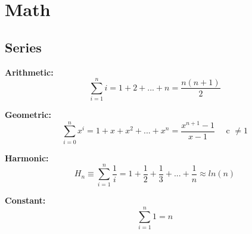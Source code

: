 \chapter{Math}

\section{Series}

\newenvironment{secDiv}[1]{\textbf{#1:}}{\newline\hspace{11pt}}

\begin{secDiv}{Arithmetic}
\begin{equation}
	\sum_{i=1}^{n}i = 1+2+...+n = \frac{n(n+1)}{2}
\end{equation}
\end{secDiv}

\begin{secDiv}{Geometric}
\begin{equation}
	\sum_{i=0}^{n}x^i = 1+x+x^2+...+x^n = \frac{x^{n+1}-1}{x-1}\textrm{~~~~c }\neq 1
\end{equation}
\end{secDiv}

\begin{secDiv}{Harmonic}
\begin{equation}
	H_n \equiv \sum_{i=1}^{n}\frac{1}{i} = 1+\frac{1}{2}+\frac{1}{3}+...+\frac{1}{n} \approx ln(n)
\end{equation}
\end{secDiv}

\begin{secDiv}{Constant}
	\begin{equation}
		\sum_{i=1}^{n}1 = n
	\end{equation}
\end{secDiv}
